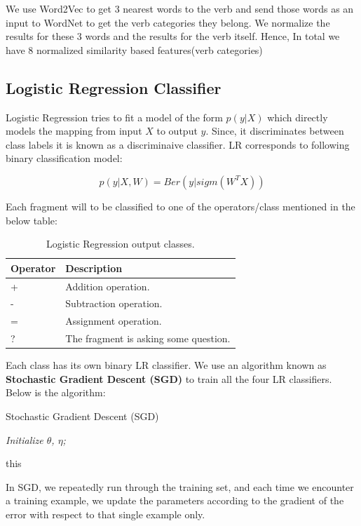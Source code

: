 \documentclass[11pt]{article}
\begin{document}
We use Word2Vec to get 3 nearest words to the verb and send those words as an input to WordNet to get the verb categories they belong. We normalize the results for these 3 words and the results for the verb itself. Hence, In total we have 8 normalized similarity based features(verb categories)

\subsection{Logistic Regression Classifier}

Logistic Regression tries to fit a model of the form \begin{math} p(y|X) \end{math} which directly models the mapping from input \begin{math}X\end{math} to output \begin{math}y\end{math}. Since, it discriminates between class labels it is known as a discriminaive classifier. LR corresponds to following binary classification model:

\begin{equation} p(y|X,W) = Ber(y|sigm(W^{T}X)) \end{equation}

Each fragment will to be classified to one of the operators/class mentioned in the below table:

\begin{table}[h!]
\centering
\begin{tabular}{ | m{5em} | m{20em} |}
\hline
 \textbf{Operator} & \textbf{Description}\\
\hline
+ & Addition operation. \\
\hline
- & Subtraction operation. \\
\hline
= & Assignment operation. \\
\hline
? & The fragment is asking some question.\\
\hline
\end{tabular}
\caption{Logistic Regression output classes.}
\label{table:19}
\end{table}

Each class has its own binary LR classifier. We use an algorithm known as \textbf{Stochastic Gradient Descent (SGD)} to train all the four LR classifiers. Below is the algorithm:

\begin{algorithm}
\caption{Stochastic Gradient Descent (SGD)}
\textit{Initialize $\theta$, $\eta$;}
\begin{algorithmic}
\Repeat 
\State this
\Until
\end{algorithmic}
\end{algorithm}

In SGD, we repeatedly run through the training set, and each time we encounter a training example, we update the parameters according to the gradient of the error with respect to that single example only.
\newpage


\end{document}
